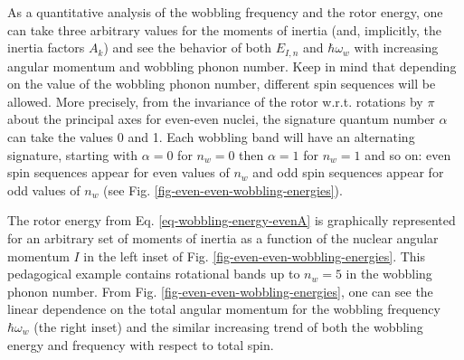 As a quantitative analysis of the wobbling frequency and the rotor energy, one can take three arbitrary values for the moments of inertia (and, implicitly, the inertia factors $A_k$) and see the behavior of both $E_{I,n}$ and $\hbar\omega_w$ with increasing angular momentum and wobbling phonon number. Keep in mind that depending on the value of the wobbling phonon number, different spin sequences will be allowed. More precisely, from the invariance of the rotor w.r.t. rotations by $\pi$ about the principal axes for even-even nuclei, the signature quantum number $\alpha$ can take the values 0 and 1. Each wobbling band will have an alternating signature, starting with $\alpha=0$ for $n_w=0$ then $\alpha=1$ for $n_w=1$ and so on: even spin sequences appear for even values of $n_w$ and odd spin sequences appear for odd values of $n_w$ (see Fig. \ref{fig-even-even-wobbling-energies}).

The rotor energy from Eq. \ref{eq-wobbling-energy-evenA} is graphically represented for an arbitrary set of moments of inertia as a function of the nuclear angular momentum $I$ in the left inset of Fig. \ref{fig-even-even-wobbling-energies}. This pedagogical example contains rotational bands up to $n_w=5$ in the wobbling phonon number. From Fig. \ref{fig-even-even-wobbling-energies}, one can see the linear dependence on the total angular momentum for the wobbling frequency $\hbar\omega_w$ (the right inset) and the similar increasing trend of both the wobbling energy and frequency with respect to total spin.

